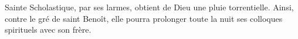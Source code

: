 Sainte Scholastique, par ses larmes, obtient de Dieu une pluie torrentielle. Ainsi, contre le gré de saint Benoît, elle pourra prolonger toute la nuit ses colloques spirituels avec son frère.
